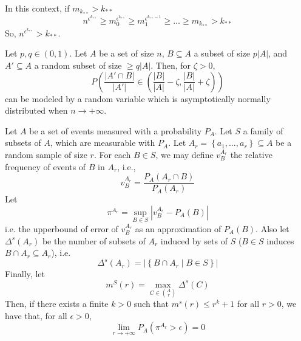 
    \remark
    In this context, if $m_{k_{**}} > k_{**}$
    \[
        n^{\epsilon^{k_{**}}} \geq m_0^{\epsilon^{k_{**}}} \geq m_1^{\epsilon^{k_{**}-1}} \geq \dots \geq m_{k_{**}} > k_{**}
    \]
    So, $n^{\epsilon^{k_{**}}} > k_{**}$.

    \lemma[Fact 5.9]\label{fact_5.9}
        Let $p,q \in \left( 0,1 \right)$.
        Let $A$ be a set of size $n$, $B \subseteq A$ a subset of size $p|A|$, and $A' \subseteq A$ a random subset
        of size $\geq q|A|$. %
        Then, for $\zeta > 0$,
        $$
            P\left( \frac{\left| A' \cap B \right|}{\left| A' \right|} \in
                 \left( \frac{\left| B \right|}{\left| A \right|} -
                 \zeta, \frac{\left| B \right|}{\left| A \right|} + \zeta \right) \right)
        $$
        can be modeled by a random variable which is asymptotically normally distributed when $n \to +\infty$.

    \lemma[Fact 5.10]\label{fact_5.10}
        Let $A$ be a set of events measured with a probability $P_A$.
        Let $S$ a family of subsets of $A$, which are measurable with $P_A$.
        Let $A_r = \left\{ a_1, \dots, a_r \right\} \subseteq A$ be a random sample of size $r$.
        For each $B \in S$, we may define $v_B^{A_r}$ the relative frequency of events of $B$ in $A_r$, i.e.,
        $$
            v_B^{A_r} = \frac{P_A(A_r \cap B)}{P_A(A_r)}
        $$
        Let
        $$
            \pi ^{A_r} = \sup_{B \in S} \left| v_B^{A_r} - P_A(B) \right|
        $$
        i.e. the upperbound of error of $v_B^{A_r}$ as an approximation of $P_A(B)$.
        Also let $\Delta^s(A_r)$ be the number of subsets of $A_r$ induced by sets of $S$ ($B\in S$ induces
        $B \cap A_r \subseteq A_r$), i.e.
        $$
            \Delta^s(A_r) = \left| \left\{ B \cap A_r \mid B \in S \right\} \right|
        $$
        Finally, let
        $$
            m^S(r) = \max_{C \in {A \choose r}} \Delta^s(C)
        $$
        Then, if there exists a finite $k > 0$ such that $m^s(r) \leq r^k +1$ for all $r > 0$, we have that,
        for all $\epsilon > 0$,
        $$
            \lim_{r \to +\infty} P_A\left( \pi^{A_r} > \epsilon \right) = 0
        $$

